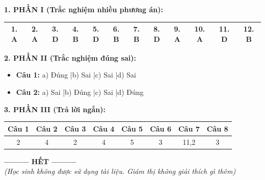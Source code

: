 \documentclass[12pt,a4paper]{article}
\begin{document}
\smallskip
\noindent
\textbf{1. PHẦN I (Trắc nghiệm nhiều phương án):}
\begin{center}
\begin{tabular}{|c|c|c|c|c|c|c|c|c|c|c|c|}
\hline
\textbf{1. A} & \textbf{2. A} & \textbf{3. D} & \textbf{4. B} & \textbf{5. D} & \textbf{6. B} & \textbf{7. B} & \textbf{8. D} & \textbf{9. A} & \textbf{10. A} & \textbf{11. D} & \textbf{12. B} \\ \hline
\end{tabular}
\end{center}

\noindent
\textbf{2. PHẦN II (Trắc nghiệm đúng sai):}
\begin{itemize}
	\item \textbf{Câu 1:} a) Đúng \quad|\quad b) Sai \quad|\quad c) Sai \quad|\quad d) Sai
	\item \textbf{Câu 2:} a) Sai \quad|\quad b) Đúng \quad|\quad c) Sai \quad|\quad d) Đúng
\end{itemize}

\noindent
\textbf{3. PHẦN III (Trả lời ngắn):}
\begin{center}
\begin{tabular}{|c|c|c|c|c|c|c|c|}
\hline
\textbf{Câu 1} & \textbf{Câu 2} & \textbf{Câu 3} & \textbf{Câu 4} & \textbf{Câu 5} & \textbf{Câu 6} & \textbf{Câu 7} & \textbf{Câu 8} \\ \hline
2 & 4 & 2 & 4 & 5 & 3 & 11,2 & 3 \\ \hline
\end{tabular}
\end{center}

\begin{center}
\textbf{--------- HẾT ---------}\\
\textit{(Học sinh không được sử dụng tài liệu. Giám thị không giải thích gì thêm)}
\end{center}
\end{document}
